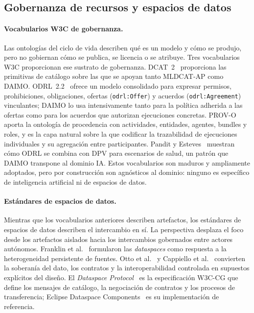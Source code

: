 \documentclass[11pt,a4paper]{article}
\newcommand{\code}[1]{\texttt{#1}}
\begin{document}
\subsection{Gobernanza de recursos y espacios de datos}

\paragraph{Vocabularios W3C de gobernanza.}

Las ontologías del ciclo de vida describen qué es un modelo y cómo se produjo, pero no gobiernan cómo se publica, se licencia o se atribuye. Tres vocabularios W3C proporcionan ese sustrato de gobernanza. DCAT~2~\cite{dcat2} proporciona las primitivas de catálogo sobre las que se apoyan tanto MLDCAT-AP como DAIMO. ODRL~2.2~\cite{odrl22} ofrece un modelo consolidado para expresar permisos, prohibiciones, obligaciones, ofertas (\code{odrl:Offer}) y acuerdos (\code{odrl:Agreement}) vinculantes; DAIMO lo usa intensivamente tanto para la política adherida a las ofertas como para los acuerdos que autorizan ejecuciones concretas. PROV-O~\cite{provo} aporta la ontología de procedencia con actividades, entidades, agentes, bundles y roles, y es la capa natural sobre la que codificar la trazabilidad de ejecuciones individuales y su agregación entre participantes. Pandit y Esteves~\cite{pandit-esteves} muestran cómo ODRL se combina con DPV para escenarios de salud, un patrón que DAIMO transpone al dominio IA. Estos vocabularios son maduros y ampliamente adoptados, pero por construcción son agnósticos al dominio: ninguno es específico de inteligencia artificial ni de espacios de datos.

\paragraph{Estándares de espacios de datos.}

Mientras que los vocabularios anteriores describen artefactos, los estándares de espacios de datos describen el intercambio en sí. La perspectiva desplaza el foco desde los artefactos aislados hacia los intercambios gobernados entre actores autónomos. Franklin et al.~\cite{franklin05} formularon las \emph{dataspaces} como respuesta a la heterogeneidad persistente de fuentes. Otto et al.~\cite{otto19} y Cappiello et al.~\cite{cappiello22} convierten la soberanía del dato, los contratos y la interoperabilidad controlada en supuestos explícitos del diseño. El \emph{Dataspace Protocol}~\cite{dsp} es la especificación W3C-CG que define los mensajes de catálogo, la negociación de contratos y los procesos de transferencia; Eclipse Dataspace Components~\cite{edc} es su implementación de referencia.
\end{document}
